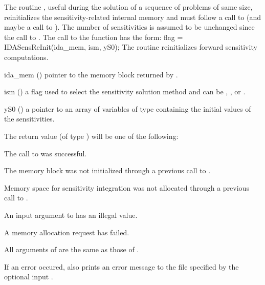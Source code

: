 The routine , useful during the solution of a sequence of problems of 
same size, reinitializes the sensitivity-related internal memory 
and must follow a call to  (and maybe a call to ). 
The number  of sensitivities is assumed to be unchanged since the call to 
.
The call to the  function has the form:
{
  flag = IDASensReInit(ida\_mem, ism, yS0);
}
{
  The routine  reinitializes forward sensitivity computations.
}
{
  \begin{args}

  \item[ida\_mem] ()
    pointer to the {\idas} memory block returned by .

  \item[ism] ()
    a flag used to select the sensitivity solution method and can 
    be , , or .

  \item[yS0] () 
    a pointer to an array of  variables of type  containing the 
    initial values of the sensitivities.

  \end{args}
}
{
  The return value  (of type ) will be one of the following:
  \begin{args}
  \item[\Id{IDA\_SUCCESS}]
    The call to  was successful.
  \item[\Id{IDA\_MEM\_NULL}] 
    The {\idas} memory block was not initialized through a 
    previous call to .
  \item[\Id{IDA\_NO\_SENS}]
    Memory space for sensitivity integration was not allocated through a 
    previous call to .
  \item[\Id{IDA\_ILL\_INPUT}] 
    An input argument to  has an illegal value.    
  \item[\Id{IDA\_MEM\_FAIL}] 
    A memory allocation request has failed.
  \end{args}
}
{
  All arguments of  are the same as those of
  .

  If an error occured,  also prints an error message to the
  file specified by the optional input .
}
